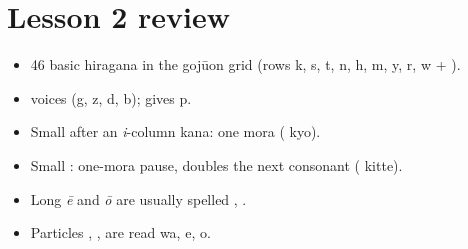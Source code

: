 \section*{Lesson 2 review}
\begin{itemize}
  \item 46 basic hiragana in the gojūon grid (rows k, s, t, n, h, m, y, r, w + ).
  \item {} voices (g, z, d, b);  gives p.
  \item Small  after an \emph{i}-column kana: one mora ( kyo).
  \item Small : one-mora pause, doubles the next consonant ( kitte).
  \item Long \emph{ē} and \emph{ō} are usually spelled , .
  \item Particles , ,  are read wa, e, o.
\end{itemize}
